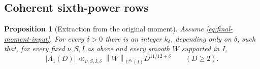 \documentclass[11pt]{article}
\numberwithin{equation}{section}
\newtheorem{proposition}[theorem]{Proposition}
\theoremstyle{definition}
\theoremstyle{remark}
\newcommand{\norm}[1]{\left\|#1\right\|}
\begin{document}
\subsection{Coherent sixth-power rows}

\begin{proposition}[Extraction from the original moment]
\label{prop:final-extraction}
Assume \eqref{eq:final-moment-input}. For every \(\delta>0\) there is
an integer \(k_\delta\), depending only on \(\delta\), such that,
for every fixed \(\nu,S,I\) as above and every smooth \(W\) supported
in \(I\),
\begin{equation}\label{eq:final-saving}
 |A_1(D)|\ll_{\nu,S,I,\delta}
          \norm{W}_{C^{k_\delta}(I)}D^{11/12+\delta}
          \qquad(D\ge2).
\end{equation}
\end{proposition}
\end{document}
